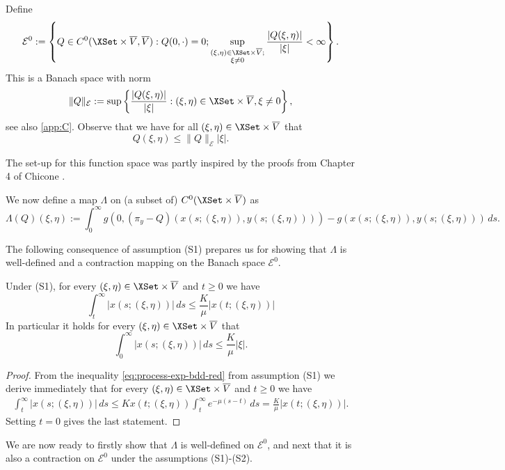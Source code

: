 \documentclass[a4paper]{siamart190516}
\begin{document}
 Define
 \[
 \mathcal{E}^0 := \left\{ Q \in C^{0}(\XSet \times \overline{V}, \overline{V}): Q(0, \cdot) =0;  \sup_{\substack{(\xi,\eta) \in \XSet \times \overline{V}; \\ \xi \neq 0}} \frac{|Q(\xi,\eta)|}{|\xi|} < \infty  \right\}.
 \]
This is a Banach space with norm
 \[
 \| Q \|_{\mathcal{E}} := \sup \left\{ \frac{|Q(\xi,\eta)|}{|\xi|} : (\xi,\eta) \in \XSet \times \overline{V}, \xi \neq 0   \right\},
 \]
 see also \cref{app:C}. Observe that we have for all $(\xi,\eta) \in \XSet \times \overline{V}$ that
 \[
 Q(\xi,\eta) \leq  \| Q \|_{\mathcal{E}} |\xi|.
 \]
 
 \begin{remark}
The set-up for this function space was partly inspired by the proofs from Chapter 4 of Chicone \cite{Ch06}.
\end{remark}
 
 We now define a map $\Lambda$ on (a subset of) $C^{0}(\XSet \times \overline{V})$ as
\[
\Lambda(Q)(\xi,\eta) := \int_0^{\infty} g(0, (\pi_y -Q)(x(s; (\xi,\eta)),y(s;(\xi,\eta)))) - g(x(s; (\xi,\eta)),y(s;(\xi,\eta))) \, ds.
\]

The following consequence of assumption (S1) prepares us for showing that $\Lambda$ is well-defined and a contraction mapping on the Banach space $ \mathcal{E}^0$. 
\begin{lemma}\label{lem:props-fast-sol-int}
Under (S1), for every $(\xi,\eta) \in \XSet \times \overline{V}$ and $t \geq 0$ we have
\[
\int_t^{\infty} |x(s;(\xi,\eta))| \, ds \leq \frac{K}{\mu} |x(t;(\xi,\eta))|
\]
In particular it holds for every $(\xi,\eta) \in \XSet \times \overline{V}$ that
\[
\int_0^{\infty} |x(s;(\xi,\eta))| \, ds \leq \frac{K}{\mu} |\xi|.
\]
\end{lemma}

\begin{proof}
From the inequality \cref{eq:process-exp-bdd-red} from assumption (S1) we derive immediately that for every $(\xi,\eta) \in \XSet \times \overline{V}$ and $t \geq 0$ we have
\begin{align*}
\int_t^{\infty} |x(s;(\xi,\eta))| \, ds \leq K x(t;(\xi,\eta)) \int_t^{\infty} e^{-\mu(s-t)} \, ds = \frac{K}{\mu} |x(t;(\xi,\eta))|.
\end{align*}
Setting $t=0$ gives the last statement. 
\end{proof}

We are now ready to firstly show that $\Lambda$ is well-defined on $\mathcal{E}^0$, and next that it is also a contraction on $\mathcal{E}^0$ under the assumptions (S1)-(S2). 
\end{document}
